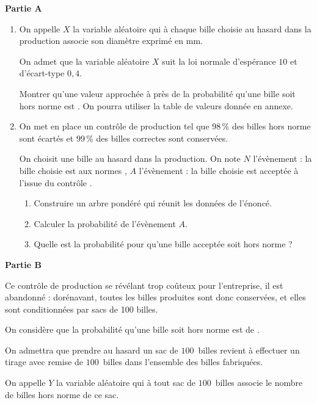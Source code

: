 \documentclass[10pt]{article}
\begin{document}
\bigskip
 
\textbf{Partie A}

\medskip
 
\begin{enumerate}
\item On appelle $X$ la variable aléatoire qui à chaque bille choisie au hasard dans la production associe son diamètre exprimé en mm.
 
On admet que la variable aléatoire $X$ suit la loi normale  d'espérance $10$ et d'écart-type $0,4$. 

Montrer qu'une valeur approchée à  près de la probabilité qu'une bille soit hors norme est . On pourra utiliser la table de valeurs donnée en annexe. 
\item On met en place un contrôle de production tel que 98\,\% des billes hors norme sont écartés et 99\,\% des billes correctes sont conservées.
 
On choisit une bille au hasard dans la production. On note $N$ l'évènement : \og la bille choisie est aux normes \fg, $A$ l'évènement : \og la bille choisie est acceptée à l'issue du contrôle \fg. 
	\begin{enumerate}
		\item Construire un arbre pondéré qui réunit les données de l'énoncé. 
		\item Calculer la probabilité de l'évènement $A$. 
		\item Quelle est la probabilité pour qu'une bille acceptée soit hors norme ?
	\end{enumerate}
\end{enumerate}
 
\bigskip
 
\textbf{Partie B}

\medskip

Ce contrôle de production se révélant trop coûteux pour l'entreprise, il est abandonné : dorénavant, toutes les billes produites sont donc conservées, et elles sont conditionnées par sacs de 100 billes. 

On considère que la probabilité qu'une bille soit hors norme est de .
 
On admettra que prendre au hasard un sac de $100$~billes revient à effectuer un tirage avec remise de $100$~billes dans l'ensemble des billes fabriquées.
 
On appelle $Y$ la variable aléatoire qui à tout sac de $100$~billes associe le nombre de billes hors norme de ce sac.
\end{document}
